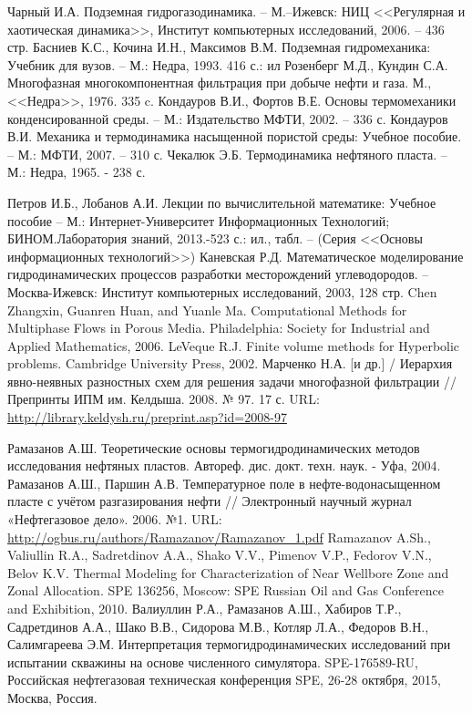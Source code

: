 \begin{thebibliography}{99}

 Чарный И.А. Подземная гидрогазодинамика. -- М.--Ижевск: НИЦ <<Регулярная и хаотическая динамика>>, Институт компьютерных исследований, 2006. -- 436 стр.
 Басниев К.С., Кочина И.Н., Максимов В.М. Подземная гидромеханика: Учебник для вузов. -- М.: Недра, 1993. 416 с.: ил
 Розенберг М.Д., Кундин С.А. Многофазная многокомпонентная фильтрация при добыче нефти и газа. М., <<Недра>>, 1976. 335 c.
 Кондауров В.И., Фортов В.Е. Основы термомеханики конденсированной среды. -- М.: Издательство МФТИ, 2002. -- 336 с.
 Кондауров В.И. Механика и термодинамика насыщенной пористой среды: Учебное пособие. -- М.: МФТИ, 2007. -- 310 с.
 Чекалюк Э.Б. Термодинамика нефтяного пласта. -- М.: Недра, 1965. - 238 с.


 Петров И.Б., Лобанов А.И. Лекции по вычислительной математике: Учебное пособие -- М.: Интернет-Университет Информационных Технологий; БИНОМ.Лаборатория знаний, 2013.-523 с.: ил., табл. -- (Серия <<Основы информационных технологий>>)
 Каневская Р.Д. Математическое моделирование гидродинамических процессов разработки месторождений углеводородов. -- Москва-Ижевск: Институт компьютерных исследований, 2003, 128 стр.
 Chen Zhangxin, Guanren Huan, and Yuanle Ma. Computational Methods for Multiphase Flows in Porous Media. Philadelphia: Society for Industrial and Applied Mathematics, 2006.
 LeVeque R.J. Finite volume methods for Hyperbolic problems. Cambridge University Press, 2002.
 Марченко Н.А. [и др.] / Иерархия явно-неявных разностных схем для решения задачи многофазной фильтрации // Препринты ИПМ им. Келдыша. 2008. № 97. 17 с. URL: \url{http://library.keldysh.ru/preprint.asp?id=2008-97}

 Рамазанов А.Ш. Теоретические основы термогидродинамических методов исследования нефтяных пластов. Автореф. дис. докт. техн. наук. - Уфа, 2004.
 Рамазанов А.Ш., Паршин А.В. Температурное поле в нефте-водонасыщенном пласте с учётом разгазирования нефти // Электронный научный журнал «Нефтегазовое дело». 2006. №1. URL: \url{http://ogbus.ru/authors/Ramazanov/Ramazanov_1.pdf}
 Ramazanov A.Sh., Valiullin R.A., Sadretdinov A.A., Shako V.V., Pimenov V.P., Fedorov V.N., Belov K.V. Thermal Modeling for Characterization of Near Wellbore Zone and Zonal Allocation. SPE 136256, Moscow: SPE Russian Oil and Gas Conference and Exhibition, 2010.
 Валиуллин Р.А., Рамазанов А.Ш., Хабиров Т.Р., Садретдинов А.А., Шако В.В., Сидорова М.В., Котляр Л.А., Федоров В.Н., Салимгареева Э.М. Интерпретация термогидродинамических  исследований при испытании скважины на основе численного симулятора. SPE-176589-RU, Российская нефтегазовая техническая конференция SPE, 26-28 октября, 2015, Москва, Россия.


\end{thebibliography}
